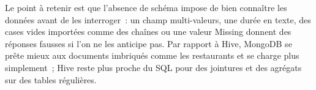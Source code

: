 \noindent Le point à retenir est que l'absence de schéma impose de bien connaître les données avant de les interroger~: un champ multi-valeurs, une durée en texte, des cases vides importées comme des chaînes ou une valeur \og Missing \fg{} donnent des réponses fausses si l'on ne les anticipe pas. Par rapport à Hive, MongoDB se prête mieux aux documents imbriqués comme les restaurants et se charge plus simplement~; Hive reste plus proche du SQL pour des jointures et des agrégats sur des tables régulières.
